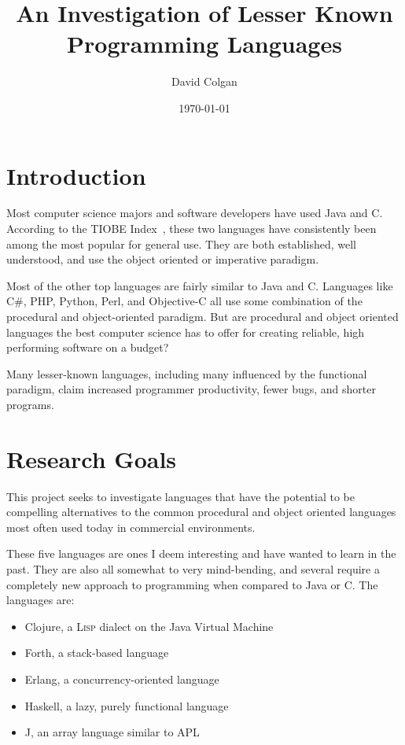 \documentclass{article}
\title{An Investigation of Lesser Known Programming Languages}
\author{David Colgan}
\date{\today}
\begin{document}
\maketitle

\section{Introduction}

Most computer science majors and software developers have used Java and C.
According to the TIOBE Index~\cite{tiobe}, these two languages have
consistently been among the most popular for general use.  They are both
established, well understood, and use the object oriented or imperative
paradigm.

Most of the other top languages are fairly similar to Java and C.  Languages
like C\#, PHP, Python, Perl, and Objective-C all use some combination of the
procedural and object-oriented paradigm.   But are procedural and object
oriented languages the best computer science has to offer for creating
reliable, high performing software on a budget?

Many lesser-known languages, including many influenced by the functional paradigm, claim
increased programmer productivity, fewer bugs, and shorter programs.

\section{Research Goals}

This project seeks to investigate languages that have the potential to be
compelling alternatives to the common procedural and object oriented languages
most often used today in commercial environments.

These five languages are ones I deem interesting and have wanted to learn in
the past.  They are also all somewhat to very mind-bending, and several require
a completely new approach to programming when compared to Java or C.  The
languages are:

\begin{itemize}
\item Clojure, a \textsc{Lisp} dialect on the Java Virtual Machine

\item Forth, a stack-based language

\item Erlang, a concurrency-oriented language

\item Haskell, a lazy, purely functional language

\item J, an array language similar to APL
\end{itemize}
\end{document}
